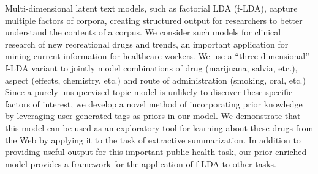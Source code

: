 Multi-dimensional latent text models, such as factorial LDA (f-LDA), capture multiple factors of corpora, creating structured output for researchers to
 better understand the contents of a corpus. We consider such models for
 clinical research of new recreational drugs and trends, an important
 application for mining current information for healthcare workers. We use a
 ``three-dimensional'' f-LDA variant to jointly model combinations of drug
 (marijuana, salvia, etc.), aspect (effects, chemistry, etc.) and route of
 administration (smoking, oral, etc.) Since a purely unsupervised topic model is
 unlikely to discover these specific factors of interest, we develop a novel
 method of incorporating prior knowledge by leveraging user generated tags as
 priors in our model. We demonstrate that this model can be used as an
 exploratory tool for learning about these drugs from the Web by applying it to
 the task of extractive summarization. In addition to providing useful output
 for this important public health task, our prior-enriched model provides a
 framework for the application of f-LDA to other tasks.

